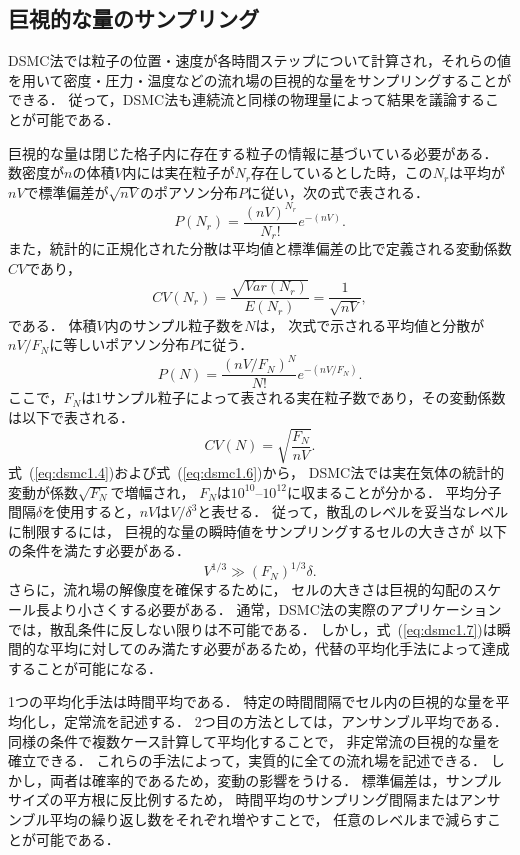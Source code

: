 \subsection{巨視的な量のサンプリング}
DSMC法では粒子の位置・速度が各時間ステップについて計算され，それらの値を用いて密度・圧力・温度などの流れ場の巨視的な量をサンプリングすることができる．
従って，DSMC法も連続流と同様の物理量によって結果を議論することが可能である．

巨視的な量は閉じた格子内に存在する粒子の情報に基づいている必要がある．
数密度が$n$の体積$V$内には実在粒子が$N_r$存在しているとした時，この$N_r$は平均が$nV$で標準偏差が$\sqrt{nV}$のポアソン分布$P$に従い，次の式で表される．
\begin{equation}
    P(N_r) = \dfrac{(nV)^{N_r}}{N_r !}e^{-(nV)}.
\end{equation}
また，統計的に正規化された分散は平均値と標準偏差の比で定義される変動係数$CV$であり，
\begin{equation}
\label{eq:dsmc1.4}
    CV(N_r) = \dfrac{\sqrt{Var(N_r)}}{E(N_r)} = \dfrac{1}{\sqrt{nV}},
\end{equation}
である．
体積$V$内のサンプル粒子数を$N$は，
次式で示される平均値と分散が$nV/F_N$に等しいポアソン分布$P$に従う．
\begin{equation}
    P(N) = \dfrac{\left(nV/F_N\right)^N}{N!} e^{-(nV/F_N)}.
\end{equation}
ここで，$F_N$は1サンプル粒子によって表される実在粒子数であり，その変動係数は以下で表される．
\begin{equation}
\label{eq:dsmc1.6}
    CV(N) = \sqrt{\dfrac{F_N}{nV}}.
\end{equation}
式~(\ref{eq:dsmc1.4})および式~(\ref{eq:dsmc1.6})から，
DSMC法では実在気体の統計的変動が係数$\sqrt{F_N}$で増幅され，
$F_N$は$10^{10}$--$10^{12}$に収まることが分かる．
平均分子間隔$\delta$を使用すると，$nV$は$V/\delta^3$と表せる．
従って，散乱のレベルを妥当なレベルに制限するには，
巨視的な量の瞬時値をサンプリングするセルの大きさが
以下の条件を満たす必要がある．
\begin{equation}
    V^{1/3} \gg (F_N)^{1/3}\delta.
    \label{eq:dsmc1.7}
\end{equation}
さらに，流れ場の解像度を確保するために，
セルの大きさは巨視的勾配のスケール長より小さくする必要がある．
通常，DSMC法の実際のアプリケーションでは，散乱条件に反しない限りは不可能である．
しかし，式~(\ref{eq:dsmc1.7})は瞬間的な平均に対してのみ満たす必要があるため，代替の平均化手法によって達成することが可能になる．

1つの平均化手法は時間平均である．
特定の時間間隔でセル内の巨視的な量を平均化し，定常流を記述する．
2つ目の方法としては，アンサンブル平均である．
同様の条件で複数ケース計算して平均化することで，
非定常流の巨視的な量を確立できる．
これらの手法によって，実質的に全ての流れ場を記述できる．
しかし，両者は確率的であるため，変動の影響をうける．
標準偏差は，サンプルサイズの平方根に反比例するため，
時間平均のサンプリング間隔またはアンサンブル平均の繰り返し数をそれぞれ増やすことで，
任意のレベルまで減らすことが可能である．


